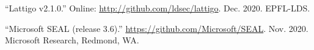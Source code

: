 \documentclass[12pt]{article}
\begin{document}
{%
\begin{thebibliography}{2}%
\label{sec-bibliography}%

\mdbibitemlabel{{}[1]}\textquotedblleft{}Lattigo v2.1.0.\textquotedblright{} Online: \href{http://github.com/ldsec/lattigo}{{\ttfamily http://\hspace{0pt}github.\hspace{0pt}com/\hspace{0pt}ldsec/\hspace{0pt}lattigo}}. Dec. 2020. EPFL-LDS.\label{lattigo}%

\mdbibitemlabel{{}[2]}\textquotedblleft{}Microsoft SEAL (release 3.6).\textquotedblright{} \href{https://github.com/Microsoft/SEAL}{{\ttfamily https://\hspace{0pt}github.\hspace{0pt}com/\hspace{0pt}Microsoft/\hspace{0pt}SEAL}}. Nov. 2020. Microsoft Research, Redmond, WA.\label{sealcrypto}%
\par%
\end{thebibliography}}%
\end{document}
